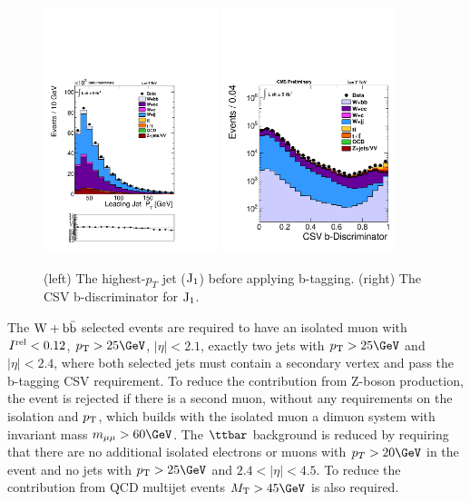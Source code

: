 \begin{figure}
\centering
\includegraphics[width=0.45\textwidth, trim = 0 4cm 0 0, clip=true ]{Wbb/fig1.pdf}
\includegraphics[width=0.45\textwidth]{Wbb/fig1_jetcsv.pdf}

\caption{(left) The highest-$p_{T}$ jet ($\rm{J_{1}}$) before applying b-tagging.
(right) The CSV b-discriminator 
for $\rm{J_{1}}$.}
\label{fig:figA}
\end{figure}



The $\mathrm{W+\mathrm{b\bar{b}}}$ selected events are required to have  
an isolated muon with $I^{\rm{rel}}<0.12$, $\pt>25\GeV$, $|\eta|<2.1$,
exactly two jets with $\pt>25\GeV$ and $|\eta|<2.4$, where 
both selected jets must contain a secondary vertex 
and pass the b-tagging CSV requirement.
To reduce the contribution from Z-boson production, the 
event is rejected if there is a second muon, without any requirements 
on the isolation and $p_\mathrm{T}$, 
which builds with the isolated muon a dimuon system with 
invariant mass $m_{\mu\mu} > 60\GeV$. 
The $\ttbar$ background is reduced by requiring
that there are no additional isolated electrons or muons with  $p_{T}>20\GeV$ in the event and no
jets with $\pt>25\GeV$ and $2.4<|\eta|<4.5$. To reduce the contribution
from QCD multijet events $\MT > 45\GeV$ is also required.

